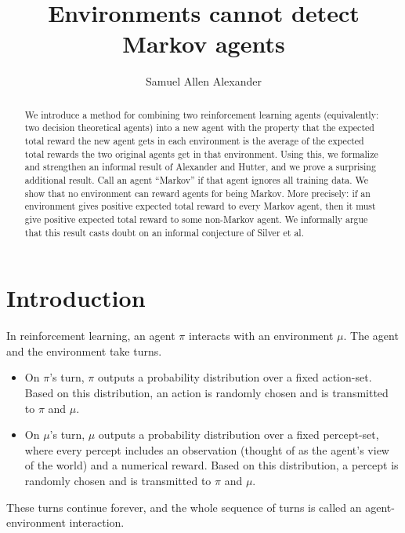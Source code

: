 \documentclass[runningheads]{llncs}
\begin{document}
\title{Environments cannot detect Markov agents}
\author{Samuel Allen
Alexander}


\maketitle

\begin{abstract}
    We introduce a method for combining two reinforcement learning agents
    (equivalently: two decision theoretical agents) into a new agent
    with the property that the expected total reward the new agent gets in
    each environment is the average of the expected total rewards the
    two original agents get in that environment. Using this, we formalize
    and strengthen an informal result of Alexander and Hutter, and
    we prove a surprising additional result. Call an agent ``Markov''
    if that agent ignores all training data. We show that no environment can
    reward agents for being Markov. More precisely: if an environment
    gives positive expected total reward to every Markov agent, then it
    must give positive expected total reward to some non-Markov agent.
    We informally argue that this result casts doubt on an informal
    conjecture of Silver et al.
\end{abstract}

\section{Introduction}

In reinforcement learning, an agent $\pi$ interacts with an environment $\mu$.
The agent and the environment take turns.
\begin{itemize}
\item
On $\pi$'s turn, $\pi$
outputs a probability distribution over a fixed action-set.
Based on this distribution, an action is randomly chosen
and is transmitted to $\pi$ and $\mu$.
\item
On $\mu$'s turn, $\mu$
outputs a probability distribution over a fixed percept-set,
where every percept includes an observation (thought of as
the agent's view of the world) and a numerical reward.
Based on this distribution, a percept is randomly chosen and
is transmitted to $\pi$ and $\mu$.
\end{itemize}
These turns continue forever, and the whole sequence of turns
is called an agent-environment interaction.
\end{document}
